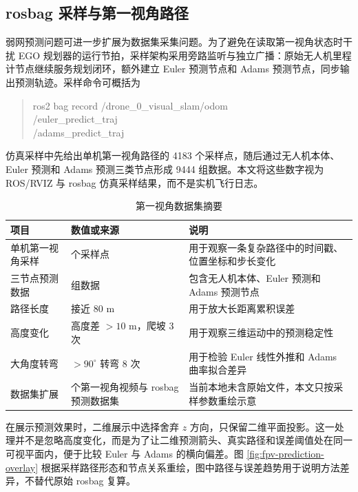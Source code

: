 \documentclass[UTF8,zihao=-4]{ctexart}
\begin{document}
\subsection{rosbag 采样与第一视角路径}
弱网预测问题可进一步扩展为数据集采集问题。为了避免在读取第一视角状态时干扰 EGO 规划器的运行节拍，采样架构采用旁路监听与独立广播：原始无人机里程计节点继续服务规划闭环，额外建立 Euler 预测节点和 Adams 预测节点，同步输出预测轨迹。采样命令可概括为
\begin{quote}
  \small\ttfamily
  ros2 bag record /drone\_0\_visual\_slam/odom\\
  /euler\_predict\_traj\\
  /adams\_predict\_traj
\end{quote}
仿真采样中先给出单机第一视角路径的 4183 个采样点，随后通过无人机本体、Euler 预测和 Adams 预测三类节点形成 9444 组数据。本文将这些数字视为 ROS/RVIZ 与 rosbag 仿真采样结果，而不是实机飞行日志。

\begin{table}[H]
  \centering
  \caption{第一视角数据集摘要}
  \label{tab:fpv-dataset-summary}
  \begin{tabularx}{\textwidth}{>{\centering\arraybackslash}p{3.3cm} >{\centering\arraybackslash}p{3.0cm} X}
    \toprule
    项目 & 数值或来源 & 说明 \\
    \midrule
    单机第一视角采样 & 4183 个采样点 & 用于观察一条复杂路径中的时间戳、位置坐标和步长变化 \\
    三节点预测数据 & 9444 组数据 & 包含无人机本体、Euler 预测和 Adams 预测节点 \\
    路径长度 & 接近 80 m & 用于放大长距离累积误差 \\
    高度变化 & 高度差 $>10$ m，爬坡 3 次 & 用于观察三维运动中的预测稳定性 \\
    大角度转弯 & $>90^\circ$ 转弯 8 次 & 用于检验 Euler 线性外推和 Adams 曲率拟合差异 \\
    数据集扩展 & 21 个第一视角视频与 rosbag 预测数据集 & 当前本地未含原始文件，本文只按采样参数重绘示意 \\
    \bottomrule
  \end{tabularx}
\end{table}

在展示预测效果时，二维展示中选择舍弃 $z$ 方向，只保留二维平面投影。这一处理并不是忽略高度变化，而是为了让二维预测箭头、真实路径和误差阈值处在同一可视平面内，便于比较 Euler 与 Adams 的横向偏差。图 \ref{fig:fpv-prediction-overlay} 根据采样路径形态和节点关系重绘，图中路径与误差趋势用于说明方法差异，不替代原始 rosbag 复算。
\end{document}
